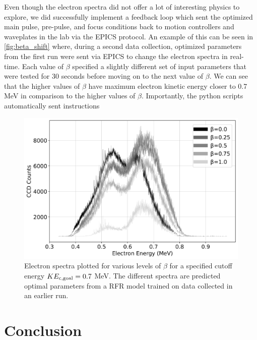 Even though the electron spectra did not offer a lot of interesting physics to explore, we did successfully implement a feedback loop which sent the optimized main pulse, pre-pulse, and focus conditions back to motion controllers and waveplates in the lab via the \gls{EPICS} protocol. An example of this can be seen in \autoref{fig:beta_shift} where, during a second data collection, optimized parameters from the first run were sent via \gls{EPICS} to change the electron spectra in real-time. Each value of $\beta$ specified a slightly different set of input parameters that were tested for 30 seconds before moving on to the next value of $\beta$. We can see that the higher values of $\beta$ have maximum electron kinetic energy closer to 0.7 MeV in comparison to the higher values of $\beta$. Importantly, the python scripts automatically sent instructions 

\begin{figure}
	\centering 
	\includegraphics[width=0.6\linewidth]{planning/images/daq/rf_beta_shift.jpg}
	\caption{Electron spectra plotted for various levels of $\beta$ for a specified cutoff energy $KE_{\rm c,goal} = 0.7$ MeV. The different spectra are predicted optimal parameters from a \gls{RFR} model trained on data collected in an earlier run.}
	\label{fig:beta_shift}
\end{figure}

\section{Conclusion}

